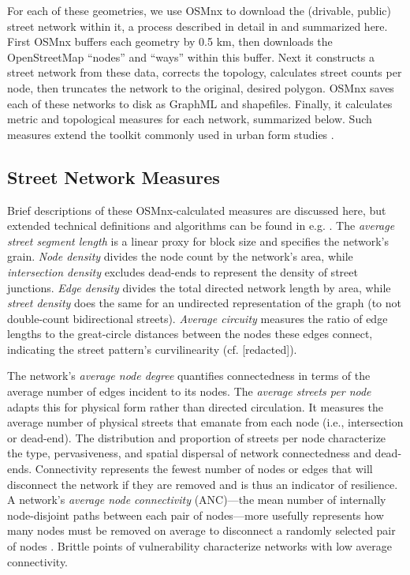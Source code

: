 \documentclass[Afour,sageh,times]{sagej}
\renewcommand{\cite}{\citep}
\begin{document}
For each of these geometries, we use OSMnx to download the (drivable, public) street network within it, a process described in detail in \cite{redacted_osmnx:_2017} and summarized here. First OSMnx buffers each geometry by 0.5 km, then downloads the OpenStreetMap \enquote{nodes} and \enquote{ways} within this buffer. Next it constructs a street network from these data, corrects the topology, calculates street counts per node, then truncates the network to the original, desired polygon. OSMnx saves each of these networks to disk as GraphML and shapefiles. Finally, it calculates metric and topological measures for each network, summarized below. Such measures extend the toolkit commonly used in urban form studies \cite{talen_measuring_2003, ewing_travel_2010}.

\subsection{Street Network Measures}

Brief descriptions of these OSMnx-calculated measures are discussed here, but extended technical definitions and algorithms can be found in e.g. \cite{trudeau_introduction_1994, albert_statistical_2002, dorogovtsev_evolution_2002, brandes_network_2005, costa_characterization_2007, newman_structure_2003, newman_networks:_2010, barthelemy_spatial_2011, cranmer_navigating_2017}. The \emph{average street segment length} is a linear proxy for block size and specifies the network's grain. \emph{Node density} divides the node count by the network's area, while \emph{intersection density} excludes dead-ends to represent the density of street junctions. \emph{Edge density} divides the total directed network length by area, while \emph{street density} does the same for an undirected representation of the graph (to not double-count bidirectional streets). \emph{Average circuity} measures the ratio of edge lengths to the great-circle distances between the nodes these edges connect, indicating the street pattern's curvilinearity (cf. [redacted]).

The network's \emph{average node degree} quantifies connectedness in terms of the average number of edges incident to its nodes. The \emph{average streets per node} adapts this for physical form rather than directed circulation. It measures the average number of physical streets that emanate from each node (i.e., intersection or dead-end). The distribution and proportion of streets per node characterize the type, pervasiveness, and spatial dispersal of network connectedness and dead-ends. Connectivity represents the fewest number of nodes or edges that will disconnect the network if they are removed and is thus an indicator of resilience. A network's \emph{average node connectivity} (ANC)---the mean number of internally node-disjoint paths between each pair of nodes---more usefully represents how many nodes must be removed on average to disconnect a randomly selected pair of nodes \cite{beineke_average_2002,dankelmann_bounds_2003}. Brittle points of vulnerability characterize networks with low average connectivity.
\end{document}
